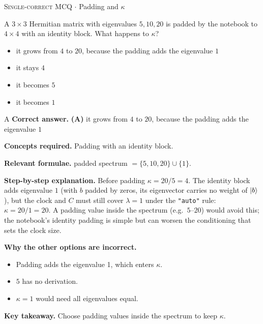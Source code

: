 \documentclass[11pt,a4paper]{article}
\newcommand{\optlabel}[1]{\textbf{(#1)}}
\newcommand{\correctlabel}[1]{\textcolor{okgreen}{\textbf{(#1)}\,\ding{51}}}
\newenvironment{qitem}[1]{\begin{list}{}{\setlength{\leftmargin}{3.3em}\setlength{\labelwidth}{3.1em}%
  \setlength{\labelsep}{0.2em}\setlength{\topsep}{3pt}\setlength{\parsep}{3pt}}\item[\textbf{Q.#1}\hfill]}{\end{list}}
\newcommand{\qsep}{\par\vspace{2pt}{\color{black!15}\hrule}\vspace{4pt}}
\newcommand{\qmeta}[2]{{\footnotesize\color{black!60}\textsc{#1} \;$\cdot$\; #2}\par}
\begin{document}
\begin{qitem}{67}
\qmeta{Single-correct MCQ}{Padding and $\kappa$}
A $3\times3$ Hermitian matrix with eigenvalues $5, 10, 20$ is padded by the notebook to $4\times4$ with an identity block. What happens to $\kappa$?
\begin{itemize}[leftmargin=2.6em, labelsep=0.4em, itemsep=2pt, topsep=3pt]
\item[\correctlabel{A}] it grows from $4$ to $20$, because the padding adds the eigenvalue $1$
\item[\optlabel{B}] it stays $4$
\item[\optlabel{C}] it becomes $5$
\item[\optlabel{D}] it becomes $1$
\end{itemize}
\end{qitem}
\begin{solbox}{A}
\textbf{\color{brand}Correct answer.} \textcolor{okgreen}{\textbf{(A)}} it grows from $4$ to $20$, because the padding adds the eigenvalue $1$

\textbf{\color{brand}Concepts required.} Padding with an identity block.

\textbf{\color{brand}Relevant formulae.} padded spectrum $= \{5, 10, 20\}\cup\{1\}$.

\textbf{\color{brand}Step-by-step explanation.} Before padding $\kappa = 20/5 = 4$. The identity block adds eigenvalue $1$ (with $b$ padded by zeros, its eigenvector carries no weight of $\ket b$), but the clock and $C$ must still cover
$\lambda = 1$ under the \texttt{"auto"} rule: $\kappa = 20/1 = 20$. A padding value inside the spectrum (e.g.\ $5$--$20$) would avoid this; the notebook's identity padding is simple but can
worsen the conditioning that sets the clock size.

\textbf{\color{brand}Why the other options are incorrect.}
\begin{itemize}[leftmargin=2.4em, itemsep=1pt, topsep=2pt]
\item[\textbf{(B)}] Padding adds the eigenvalue 1, which enters $\kappa$.
\item[\textbf{(C)}] $5$ has no derivation.
\item[\textbf{(D)}] $\kappa = 1$ would need all eigenvalues equal.
\end{itemize}
\textbf{\color{brand}Key takeaway.} Choose padding values inside the spectrum to keep $\kappa$.
\end{solbox}
\qsep
\end{document}
